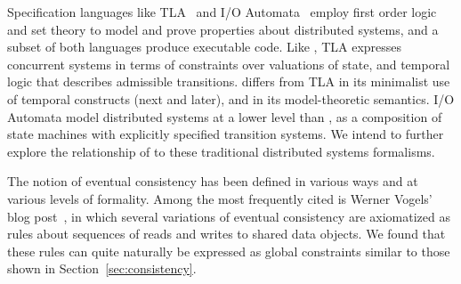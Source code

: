 \begin{comment}
\jmh{This whole paragraph makes me very nervous.  I'm not sure how what we're doing exactly relates to serializability, much less linearizability about which I know much less.  Do we really need to bring this up?}
Our attempts to model and verify properties specific to distributed systems like 
confluence and consistency of replicated state are similar in spirit to the database literature
describing serializable transactions~\cite{serializability}.  Similarly, the programming languages
community has formalized the notion of linearizable~\cite{linearizability} operations on
concurrent data structures.  Abstractly, serializability differs from linearizability in that the
former is a global property while the latter is local to individual structures and operations;
our model-theoretic analyses encompass both global (e.g., confluence) and local (e.g., downstream 
confluence) properties, but differ from both traditions in that they are applied at a higher
level, based upon the scope and boundaries of logical monotonicity rather than the intersection of read and write sets for shared objects \paa{ugh, rewrite me please}.


\jmh{How about a short paragraph on Vogel's alternative definitions of EC, and how they represent different constraints in the spirit of Section 4?  Leave it to future work to provably ensure these constraints.}

\jmh{How about an admission that while our formalism is cool and enabled us to do new stuff, it would be nice to explore its relationship to traditional distributed systems formalisms like IOA and TLA+.}
\end{comment}

Specification languages like TLA~\cite{tla} and I/O Automata~\cite{ioa}  employ
first order logic and set theory to model and prove properties about distributed systems, 
and a subset of both languages produce executable code.  Like \lang, TLA expresses
concurrent systems in terms of constraints over valuations of state, and temporal logic that describes admissible transitions.  \lang differs from TLA in its  minimalist use of temporal constructs (next and later), and in its model-theoretic semantics.  I/O Automata model
distributed systems at a lower level than \lang, as a composition of state machines with explicitly specified  transition systems.  We intend to further explore the relationship
of \lang to these traditional distributed systems formalisms.

The notion of eventual consistency has been defined in various ways and at various levels of
formality.  Among the most frequently cited is Werner Vogels' blog post~\cite{vogels-ec},
in which several variations of  eventual consistency are axiomatized as rules about 
sequences of reads and writes to shared data objects.  We found that these rules can quite
naturally be expressed as global constraints similar to those shown in 
Section~\ref{sec:consistency}.
